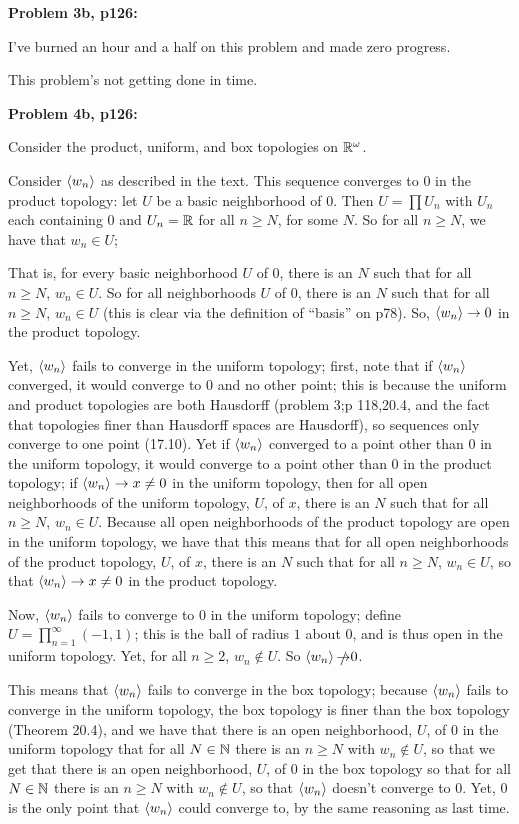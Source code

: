 \documentclass[a4paper,12pt]{article}
\begin{document}
\shunt

{\bf Problem 3b, p126:} 

I've burned an hour and a half on this problem and made zero progress.

This problem's not getting done in time.

\shunt

{\bf Problem 4b, p126:}

Consider the product, uniform, and box topologies on $\mathbb{R}^\omega$.

Consider $\left\langle w_n \right\rangle$ as described in the text. This sequence converges to $0$ in the product topology: let $U$ be a basic neighborhood of $0$. Then $U = \prod U_n$ with $U_n$ each containing $0$ and $U_n = \mathbb{R}$ for all $n \geq N$, for some $N$. So for all $n \geq N$, we have that $w_n \in U$; %

That is, for every basic neighborhood $U$ of $0$, there is an $N$ such that for all $n \geq N$, $w_n \in U$. So for all neighborhoods $U$ of $0$, there is an $N$ such that for all $n \geq N$, $w_n \in U$ (this is clear via the definition of ``basis'' on p78). So, $\left\langle w_n \right\rangle \to 0$ in the product topology.

Yet, $\left\langle w_n \right\rangle$ fails to converge in the uniform topology; first, note that if $\left\langle w_n \right\rangle$ converged, it would converge to $0$ and no other point; this is because the uniform and product topologies are both Hausdorff (problem 3;p 118,20.4, and the fact that topologies finer than Hausdorff spaces are Hausdorff), so sequences only converge to one point (17.10). Yet if $\left\langle w_n \right\rangle$ converged to a point other than $0$ in the uniform topology, it would converge to a point other than $0$ in the product topology; if $\left\langle w_n \right\rangle \to x \neq 0$ in the uniform topology, then for all open neighborhoods of the uniform topology, $U$, of $x$, there is an $N$ such that for all $n \geq N$, $w_n \in U$. Because all open neighborhoods of the product topology are open in the uniform topology, we have that this means that for all open neighborhoods of the product topology, $U$, of $x$, there is an $N$ such that for all $n \geq N$, $w_n \in U$, so that $\left\langle w_n \right\rangle \to x \neq 0$ in the product topology.

Now, $\left\langle w_n \right\rangle$ fails to converge to $0$ in the uniform topology; define $U = \prod_{n=1}^\infty (-1,1)$; this is the ball of radius $1$ about $0$, and is thus open in the uniform topology. Yet, for all $n \geq 2$, $w_n \notin U$. So $\left\langle w_n \right\rangle \slashed{\to} 0$.

This means that $\left\langle w_n \right\rangle$ fails to converge in the box topology; because $\left\langle w_n \right\rangle$ fails to converge in the uniform topology, the box topology is finer than the box topology (Theorem 20.4), and we have that there is an open neighborhood, $U$, of $0$ in the uniform topology that for all $N \in \mathbb{N}$ there is an $n \geq N$ with $w_n \notin U$,
so that we get that there is an open neighborhood, $U$, of $0$ in the box topology so that
for all $N \in \mathbb{N}$ there is an $n \geq N$ with $w_n \notin U$,
so that $\left\langle w_n \right\rangle$ doesn't converge to $0$. Yet, $0$ is the only point that $\left\langle w_n \right\rangle$ could converge to, by the same reasoning as last time.
\end{document}

